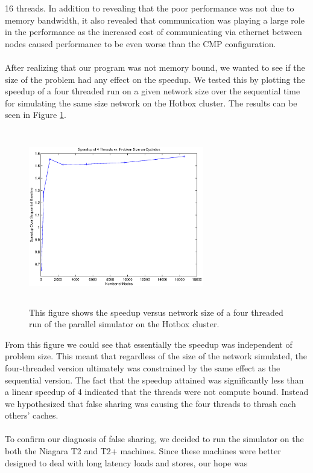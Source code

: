 \documentclass[twocolumn]{article}
\begin{document}
16 threads.  In addition to revealing that the poor performance was not
due to memory bandwidth, it also revealed that communication was playing a
large role in the performance as the increased cost of communicating via
ethernet between nodes caused performance to be even worse than the CMP
configuration.\\
~\\
After realizing that our program was not memory bound, we wanted to see if
the size of the problem had any effect on the speedup.  We tested this by
plotting the speedup of a four threaded run on a given network size over the
sequential time for simulating the same size network on the Hotbox
cluster.  The results can be seen in Figure \ref{probsize}.
\begin{figure}[h]
\centering
\includegraphics[height=3in,width=3in]{probsize.eps}
\caption{\label{probsize}This figure shows the speedup versus network size of a
four threaded run of the parallel simulator on the Hotbox cluster.}
\end{figure}
From this figure we could see that essentially the speedup was independent
of problem size.  This meant that regardless of the size of the network
simulated, the four-threaded version ultimately was constrained by the
same effect as the sequential version.  The fact that the speedup
attained was significantly less than a linear speedup of 4 indicated that
the threads were not compute bound.  Instead we hypothesized that false
sharing was causing the four threads to thrash each others' caches.\\
~\\
To confirm our diagnosis of false sharing, we decided to run the simulator
on the both the Niagara T2 and T2+ machines.  Since these machines were
better designed to deal with long latency loads and stores, our hope was
\end{document}
